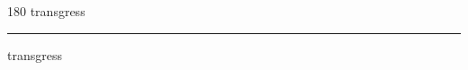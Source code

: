 
\begin{frame}
\begin{center}
\begin{turn}{180}
{\fontsize{2.5cm}{1em}\selectfont transgress}
\end{turn}
\vspace{1em}\par  
\hrule
\vspace{1em}\par  
{\fontsize{2.5cm}{1em}\selectfont transgress}
\end{center}
\end{frame}
